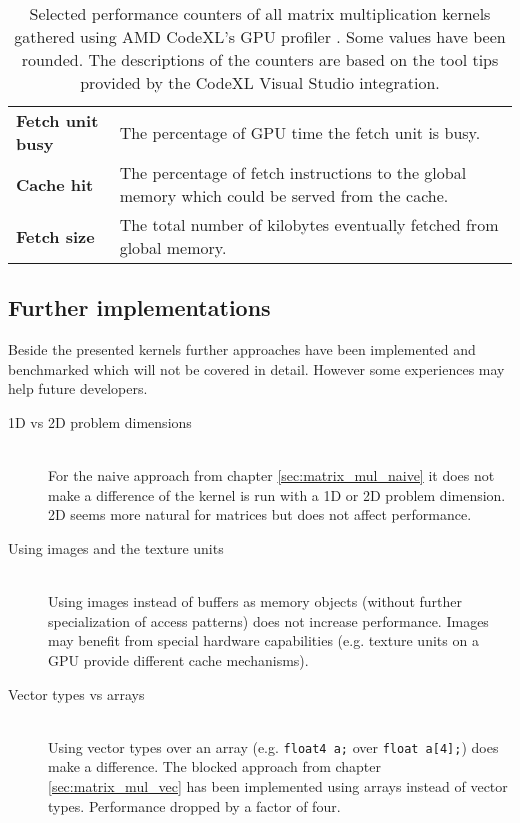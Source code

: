 \begin{table}
\begin{tabularx}{\textwidth}{>{\bfseries}l X}
		Fetch unit busy &
		The percentage of GPU time the fetch unit is busy. \\
		Cache hit &
		The percentage of fetch instructions to the global memory which could be served from the cache. \\
		Fetch size &
		The total number of kilobytes eventually fetched from global memory. \\
	\end{tabularx}
		
	\caption{Selected performance counters of all matrix multiplication kernels gathered using AMD CodeXL's GPU profiler \cite{amd_codexl}. Some values have been rounded. The descriptions of the counters are based on the tool tips provided by the CodeXL Visual Studio integration.}
	\label{tbl:matrix_perf_counter}
\end{table}

\subsection{Further implementations}
Beside the presented kernels further approaches have been implemented and benchmarked which will not be covered in detail. However some experiences may help future developers.

\begin{description}
	\item[1D vs 2D problem dimensions] \hfill \\
	For the naive approach from chapter \ref{sec:matrix_mul_naive} it does not make a difference of the kernel is run with a 1D or 2D problem dimension. 2D seems more natural for matrices but does not affect performance.
	\item[Using images and the texture units] \hfill \\
	Using images instead of buffers as memory objects (without further specialization of access patterns) does not increase performance. Images may benefit from special hardware capabilities (e.g. texture units on a GPU provide different cache mechanisms).
	\item[Vector types vs arrays] \hfill \\
	Using vector types over an array (e.g. \lstinline!float4 a;! over \lstinline!float a[4];!) does make a difference. The blocked approach from chapter \ref{sec:matrix_mul_vec} has been implemented using arrays instead of vector types. Performance dropped by a factor of four.
\end{description}

